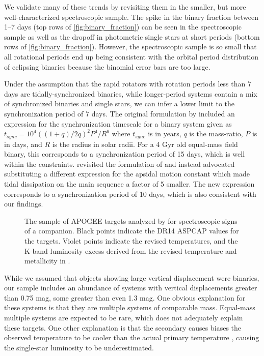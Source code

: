 \documentclass[manuscript]{aastex6}
\begin{document}
We validate many of these trends by revisiting them in the smaller, but more
well-characterized spectroscopic sample. The spike in the binary fraction
between 1--7 days (top rows of \cref{fig:binary_fraction}) can be seen in the 
spectroscopic sample as well as the dropoff in photometric single stars at
short periods (bottom rows of \cref{fig:binary_fraction}). However, the
spectroscopic sample is so small that all rotational periods end up being
consistent with the orbital period distribution of eclipsing binaries because
the binomial error bars are too large.

Under the assumption that the rapid rotators with rotation periods less than 7
days are tidally-synchronized binaries, while longer-period systems contain a
mix of synchronized binaries and single stars, we can infer a lower limit
to the synchronization period of 7 days. The original formulation by
\citep{Zahn77} included an expression for the synchronization timescale for a
binary system given as \(t_{sync} = 10^4 ((1+q)/2q)^2 P^4 / R^6\) where \(t_{sync}\) is
in years, \(q\) is the mass-ratio, \(P\) is in days, and \(R\) is the radius in
solar radii. For a 4 Gyr old equal-mass field binary, this
corresponds to a synchronization period of 15 days, which is well within the
constraints. \citet{Claret97} revisited the formulation of \citet{Zahn77} and
instead advocated substituting a different expression for the apsidal motion 
constant which made tidal dissipation on the main sequence a factor of 5
smaller. The new expression corresponds to a synchronization period of 10 days,
which is also consistent with our findings.

\begin{figure}[htb]
    \centering
    \caption{The sample of APOGEE targets analyzed by \citet{ElBadry18b} for
    spectroscopic signs of a companion. Black points indicate the DR14 ASPCAP
values for the targets. Violet points indicate the revised temperatures, and the
K-band luminosity excess derived from the revised temperature and metallicity
in \citet{ElBadry18b}.}
    \label{fig:elbadry_excess}
\end{figure}

While we assumed that objects showing large vertical displacement were
binaries, our sample includes an abundance of systems with vertical
displacements greater than 0.75 mag, some greater than even 1.3 mag. One
obvious explanation for these systems is that they are multiple systems of
comparable mass. Equal-mass multiple systems are expected to be rare, which
does not adequately explain these targets. One other explanation is that the 
secondary causes biases the observed temperature to be cooler than the actual 
primary temperature \citep{Pinsonneault12,ElBadry18a}, causing the single-star 
luminosity to be underestimated. 
\end{document}
